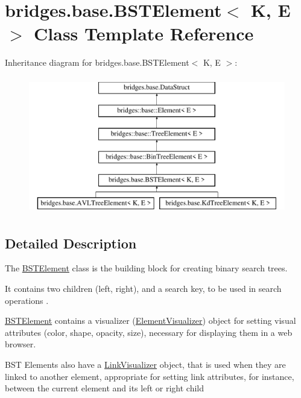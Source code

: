 \hypertarget{classbridges_1_1base_1_1_b_s_t_element}{}\section{bridges.\+base.\+B\+S\+T\+Element$<$ K, E $>$ Class Template Reference}
\label{classbridges_1_1base_1_1_b_s_t_element}
Inheritance diagram for bridges.\+base.\+B\+S\+T\+Element$<$ K, E $>$\+:\begin{figure}[H]
\begin{center}
\leavevmode
\includegraphics[height=6.000000cm]{classbridges_1_1base_1_1_b_s_t_element}
\end{center}
\end{figure}


\subsection{Detailed Description}
The \mbox{\hyperlink{classbridges_1_1base_1_1_b_s_t_element}{B\+S\+T\+Element}} class is the building block for creating binary search trees. 

It contains two children (left, right), and a search key, to be used in search operations .

\mbox{\hyperlink{classbridges_1_1base_1_1_b_s_t_element}{B\+S\+T\+Element}} contains a visualizer (\mbox{\hyperlink{classbridges_1_1base_1_1_element_visualizer}{Element\+Visualizer}}) object for setting visual attributes (color, shape, opacity, size), necessary for displaying them in a web browser.

B\+ST Elements also have a \mbox{\hyperlink{classbridges_1_1base_1_1_link_visualizer}{Link\+Visualizer}} object, that is used when they are linked to another element, appropriate for setting link attributes, for instance, between the current element and its left or right child

